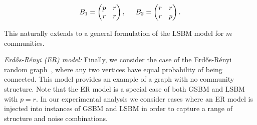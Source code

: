 \documentclass{article}
\newcommand{\er}{Erd\H{o}s-R\'{e}nyi }
\begin{document}
\[
B_1=\begin{pmatrix}
p & r \\
r & r
\end{pmatrix},
\hspace{0.5cm}
B_2=\begin{pmatrix}
r & r \\
r & p
\end{pmatrix}
.\]

This naturally extends to a general formulation of the LSBM model for $m$
communities.

{\em \er (ER) model:} Finally, we consider the case of the \er random
graph~\cite{Erdos60}, where any two vertices have equal probability of being
connected. This model provides an example of a graph with no community
structure. Note that the ER model is a special case of both GSBM and LSBM with
$p=r$. In our experimental analysis we consider cases where an ER model is
injected into instances of GSBM and LSBM in order to capture a range of
structure and noise combinations.

\begin{table}
\centering
{}
\caption{Description of datasets analyzed. Total number of vertices in each
synthetic source graph is $n=500$.  $m$ is the number of graph sources. $k$ is the number of clusters. $n_i$ represents
number of vertices in cluster $i$. $p_i$ and $r_i$ represent the within- and
across-cluster edge probability for each the $m$ graph sources.}
\label{datasets}
\end{table}
\end{document}
